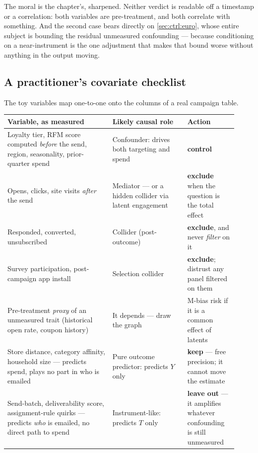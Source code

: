 The moral is the chapter's, sharpened. Neither verdict is readable off a timestamp or a
correlation: both variables are pre-treatment, and both correlate with something. And the second
case bears directly on \cref{sec:ctrl:euro}, whose entire subject is bounding the residual
unmeasured confounding --- because conditioning on a near-instrument is the one adjustment that
makes that bound worse without anything in the output moving.

\subsection*{A practitioner's covariate checklist}

The toy variables map one-to-one onto the columns of a real campaign table.

\begin{center}\small
\begin{tabular}{@{}p{0.42\linewidth} p{0.30\linewidth} p{0.20\linewidth}@{}}
\toprule
\textbf{Variable, as measured} & \textbf{Likely causal role} & \textbf{Action} \\
\midrule
Loyalty tier, RFM score computed \emph{before} the send, region, seasonality, prior-quarter spend
  & Confounder: drives both targeting and spend & \textbf{control} \\[2pt]
Opens, clicks, site visits \emph{after} the send
  & Mediator --- or a hidden collider via latent engagement & \textbf{exclude} when the question
    is the total effect \\[2pt]
Responded, converted, unsubscribed
  & Collider (post-outcome) & \textbf{exclude}, and never \emph{filter} on it \\[2pt]
Survey participation, post-campaign app install
  & Selection collider & \textbf{exclude}; distrust any panel filtered on them \\[2pt]
Pre-treatment \emph{proxy} of an unmeasured trait (historical open rate, coupon history)
  & It depends --- draw the graph & M-bias risk if it is a common effect of latents \\[2pt]
Store distance, category affinity, household size --- predicts spend, plays no part in who is emailed
  & Pure outcome predictor: predicts $Y$ only & \textbf{keep} --- free precision; it cannot move
    the estimate \\[2pt]
Send-batch, deliverability score, assignment-rule quirks --- predicts \emph{who} is emailed, no
  direct path to spend
  & Instrument-like: predicts $T$ only & \textbf{leave out} --- it amplifies whatever confounding
    is still unmeasured \\
\bottomrule
\end{tabular}
\end{center}

